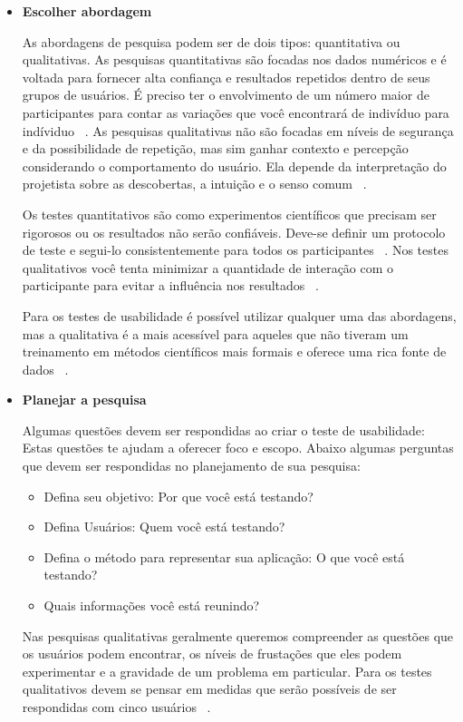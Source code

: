 \begin{itemize}

\item \textbf{Escolher abordagem}

As abordagens de pesquisa podem ser de dois tipos: quantitativa ou qualitativas. 
%
As pesquisas quantitativas são focadas nos dados numéricos e é voltada para fornecer alta confiança e resultados repetidos dentro de seus grupos de usuários. É preciso ter o envolvimento de um número maior de participantes para contar as variações que você encontrará de indivíduo para indíviduo ~\cite{unger2009}.
%
As pesquisas qualitativas não são focadas em níveis de segurança e da possibilidade de repetição, mas sim ganhar contexto e percepção considerando o comportamento do usuário. Ela depende da interpretação do projetista sobre as descobertas, a intuição e o senso comum ~\cite{unger2009}.

Os testes quantitativos são como experimentos científicos que precisam ser rigorosos ou os resultados não serão confiáveis. Deve-se definir um protocolo de teste e segui-lo consistentemente para todos os participantes ~\cite{krug2010}.
%
Nos testes qualitativos você tenta minimizar a quantidade de interação com o participante para evitar a influência nos resultados ~\cite{krug2010}.

	Para os testes de usabilidade é possível utilizar qualquer uma das abordagens, mas a qualitativa é a mais acessível para aqueles que não tiveram um treinamento em métodos científicos mais formais e oferece uma rica fonte de dados ~\cite{unger2009}.


\item \textbf{Planejar a pesquisa}

Algumas questões devem ser respondidas ao criar o teste de usabilidade: Estas questões te ajudam a oferecer foco e escopo. Abaixo algumas perguntas que devem ser respondidas no planejamento de sua pesquisa:

\begin{itemize}
\item Defina seu objetivo: Por que você está testando? %
\item Defina Usuários: Quem você está testando? %
\item Defina o método para representar sua aplicação: O que você está testando?
\item Quais informações você está reunindo? 
\end{itemize}

Nas pesquisas qualitativas geralmente queremos compreender as questões que os usuários podem encontrar, os níveis de frustações que eles podem experimentar e a gravidade de um problema em particular. Para os testes qualitativos devem se pensar em medidas que serão possíveis de ser respondidas com cinco usuários ~\cite{unger2009}. 


\end{itemize}

